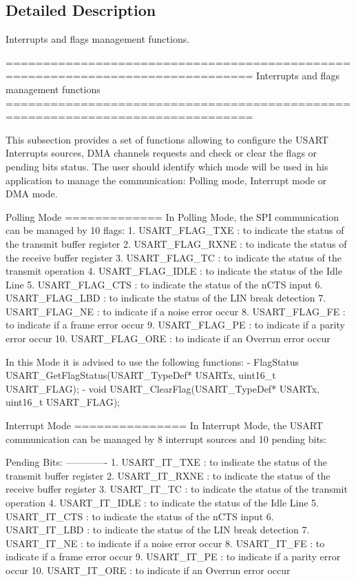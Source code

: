 \subsection{Detailed Description}
Interrupts and flags management functions. 

\begin{DoxyVerb} ===============================================================================
                   Interrupts and flags management functions
 ===============================================================================  

  This subsection provides a set of functions allowing to configure the USART 
  Interrupts sources, DMA channels requests and check or clear the flags or 
  pending bits status.
  The user should identify which mode will be used in his application to manage 
  the communication: Polling mode, Interrupt mode or DMA mode. 
    
  Polling Mode
  =============
  In Polling Mode, the SPI communication can be managed by 10 flags:
     1. USART_FLAG_TXE : to indicate the status of the transmit buffer register
     2. USART_FLAG_RXNE : to indicate the status of the receive buffer register
     3. USART_FLAG_TC : to indicate the status of the transmit operation
     4. USART_FLAG_IDLE : to indicate the status of the Idle Line             
     5. USART_FLAG_CTS : to indicate the status of the nCTS input
     6. USART_FLAG_LBD : to indicate the status of the LIN break detection
     7. USART_FLAG_NE : to indicate if a noise error occur
     8. USART_FLAG_FE : to indicate if a frame error occur
     9. USART_FLAG_PE : to indicate if a parity error occur
     10. USART_FLAG_ORE : to indicate if an Overrun error occur

  In this Mode it is advised to use the following functions:
      - FlagStatus USART_GetFlagStatus(USART_TypeDef* USARTx, uint16_t USART_FLAG);
      - void USART_ClearFlag(USART_TypeDef* USARTx, uint16_t USART_FLAG);

  Interrupt Mode
  ===============
  In Interrupt Mode, the USART communication can be managed by 8 interrupt sources
  and 10 pending bits: 

  Pending Bits:
  ------------- 
     1. USART_IT_TXE : to indicate the status of the transmit buffer register
     2. USART_IT_RXNE : to indicate the status of the receive buffer register
     3. USART_IT_TC : to indicate the status of the transmit operation
     4. USART_IT_IDLE : to indicate the status of the Idle Line             
     5. USART_IT_CTS : to indicate the status of the nCTS input
     6. USART_IT_LBD : to indicate the status of the LIN break detection
     7. USART_IT_NE : to indicate if a noise error occur
     8. USART_IT_FE : to indicate if a frame error occur
     9. USART_IT_PE : to indicate if a parity error occur
     10. USART_IT_ORE : to indicate if an Overrun error occur


\end{DoxyVerb}
